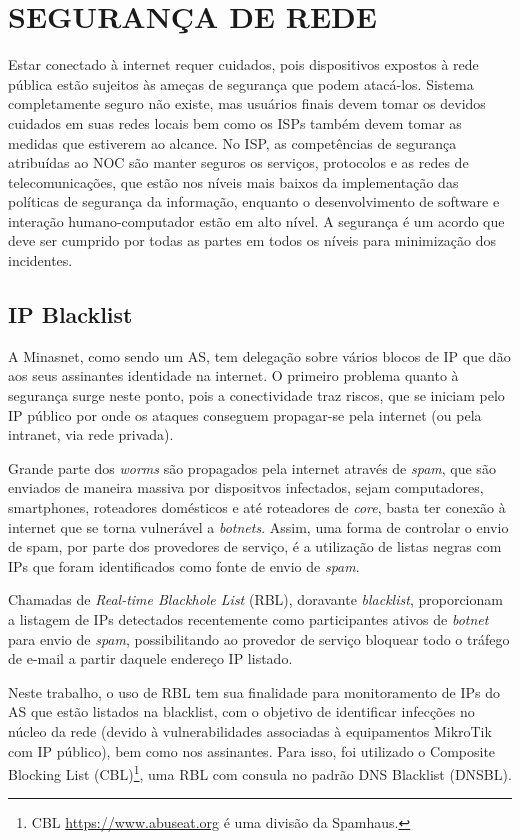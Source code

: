 \chapter{SEGURANÇA DE REDE}

    Estar conectado à internet requer cuidados, pois dispositivos expostos à rede pública estão sujeitos às ameças de segurança que podem atacá-los. Sistema completamente seguro não existe, mas usuários finais devem tomar os devidos cuidados em suas redes locais bem como os ISPs também devem tomar as medidas que estiverem ao alcance. No ISP, as competências de segurança atribuídas ao NOC são manter seguros os serviços, protocolos e as redes de telecomunicações, que estão nos níveis mais baixos da implementação das políticas de segurança da informação, enquanto o desenvolvimento de software e interação humano-computador estão em alto nível. A segurança é um acordo que deve ser cumprido por todas as partes em todos os níveis para minimização dos incidentes.

\section{IP Blacklist}

    A Minasnet, como sendo um AS, tem delegação sobre vários blocos de IP que dão aos seus assinantes identidade na internet. O primeiro problema quanto à segurança surge neste ponto, pois a conectividade traz riscos, que se iniciam pelo IP público por onde os ataques conseguem propagar-se pela internet (ou pela intranet, via rede privada).
    
    Grande parte dos \textit{worms} são propagados pela internet através de \textit{spam}, que são enviados de maneira massiva por dispositvos infectados, sejam computadores, smartphones, roteadores domésticos e até roteadores de \textit{core}, basta ter conexão à internet que se torna vulnerável a \textit{botnets}. Assim, uma forma de controlar o envio de spam, por parte dos provedores de serviço, é a utilização de listas negras com IPs que foram identificados como fonte de envio de \textit{spam}.
    
    Chamadas de \textit{Real-time Blackhole List} (RBL), doravante \textit{blacklist}, proporcionam a listagem de IPs detectados recentemente como participantes ativos de \textit{botnet} para envio de \textit{spam}, possibilitando ao provedor de serviço bloquear todo o tráfego de e-mail a partir daquele endereço IP listado. 
    
    Neste trabalho, o uso de RBL tem sua finalidade para monitoramento de IPs do AS que estão listados na blacklist, com o objetivo de identificar infecções no núcleo da rede (devido à vulnerabilidades associadas à equipamentos MikroTik com IP público), bem como nos assinantes. Para isso, foi utilizado o Composite Blocking List (CBL)\footnote{CBL \url{https://www.abuseat.org} é uma divisão da Spamhaus.}, uma RBL com consula no padrão DNS Blacklist (DNSBL).
    
